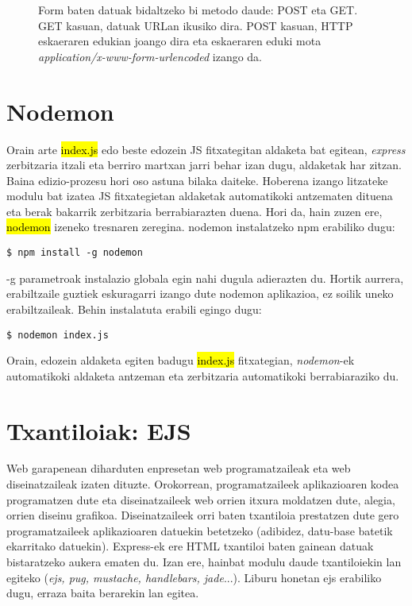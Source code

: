 \begin{figure}[ht]
	\centering
{}
\caption{Form baten datuak bidaltzeko bi metodo daude: POST eta GET. GET kasuan, datuak URLan ikusiko dira. POST kasuan, HTTP eskaeraren edukian joango dira eta eskaeraren eduki mota \textit{application/x-www-form-urlencoded} izango da.}
\label{fig:form-urlencoded}
\end{figure}

\section{Nodemon}
Orain arte \hl{index.js} edo beste edozein JS fitxategitan aldaketa bat egitean, \textit{express} zerbitzaria itzali eta berriro martxan jarri behar izan dugu, aldaketak har zitzan. Baina edizio-prozesu hori oso astuna bilaka daiteke. Hoberena izango litzateke modulu bat izatea JS fitxategietan aldaketak automatikoki antzematen dituena eta berak bakarrik zerbitzaria berrabiarazten duena. Hori da, hain zuzen ere, \hl{nodemon} izeneko tresnaren zeregina. nodemon instalatzeko npm erabiliko dugu:

\begin{lstlisting}[numbers=none]
$ npm install -g nodemon    
\end{lstlisting}

-g parametroak instalazio globala egin nahi dugula adierazten du. Hortik aurrera, erabiltzaile guztiek eskuragarri izango dute nodemon aplikazioa, ez soilik uneko erabiltzaileak. Behin instalatuta erabili egingo dugu:

\begin{lstlisting}[numbers=none]
$ nodemon index.js
\end{lstlisting}

Orain, edozein aldaketa egiten badugu \hl{index.js} fitxategian, \textit{nodemon}-ek automatikoki aldaketa antzeman eta zerbitzaria automatikoki berrabiaraziko du. 

\section{Txantiloiak: EJS}
Web garapenean diharduten enpresetan web programatzaileak eta web diseinatzaileak izaten dituzte. Orokorrean, programatzaileek aplikazioaren kodea programatzen dute eta diseinatzaileek web orrien itxura moldatzen dute, alegia, orrien diseinu grafikoa. Diseinatzaileek orri baten txantiloia prestatzen dute gero programatzaileek aplikazioaren datuekin betetzeko (adibidez, datu-base batetik ekarritako datuekin). Express-ek ere HTML txantiloi baten gainean datuak bistaratzeko aukera ematen du. Izan ere, hainbat modulu daude txantiloiekin lan egiteko (\textit{ejs, pug, mustache, handlebars, jade}...). Liburu honetan ejs erabiliko dugu, erraza baita berarekin lan egitea.

